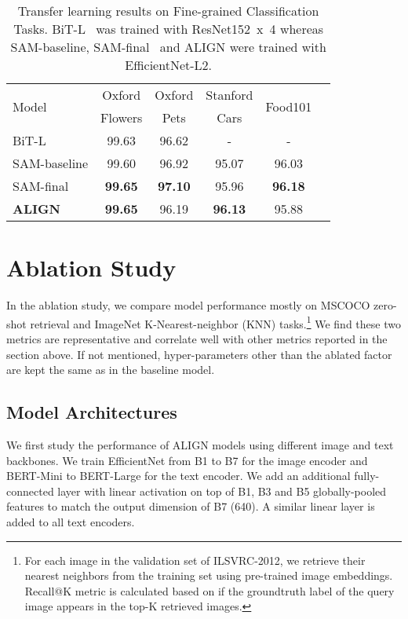 \documentclass{article}
\begin{document}
\begin{table}[h!]
\vspace{-2mm}
\begin{center}
\caption{Transfer learning results on Fine-grained Classification Tasks. BiT-L~\cite{kolensnikov:bit} was trained with ResNet152~x~4 whereas SAM-baseline, SAM-final~\cite{foret:sam} and ALIGN were trained with EfficientNet-L2.}
\label{tab:small_result}
\vskip 0.05in
\begin{small}
\begin{tabular}{l|ccccc}
\toprule
\multirow{2}{*}{Model} & Oxford  & Oxford & Stanford & \multirow{2}{*}{Food101} \\
& Flowers & Pets & Cars & \\
\midrule
BiT-L& 99.63 & 96.62 & -  & - \\
SAM-baseline
& 99.60 & 96.92 & 95.07 & 96.03 \\
SAM-final
& \textbf{99.65} & \textbf{97.10} & 95.96  & \textbf{96.18} \\
\bf{ALIGN}
& \textbf{99.65} & 96.19 & \textbf{96.13} & 95.88 \\
\bottomrule
\end{tabular}
\end{small}
\end{center}
\vspace{-5mm}
\end{table}

\section{Ablation Study}\label{sec:ablation}

In the ablation study, we compare model performance mostly on MSCOCO zero-shot retrieval and ImageNet K-Nearest-neighbor (KNN) tasks.\footnote{For each image in the validation set of ILSVRC-2012, we retrieve their nearest neighbors from the training set using pre-trained image embeddings. Recall@K metric is calculated based on if the groundtruth label of the query image appears in the top-K retrieved images.} We find these two metrics are representative and correlate well with other metrics reported in the section above. If not mentioned, hyper-parameters other than the ablated factor are kept the same as in the baseline model.

\subsection{Model Architectures}
We first study the performance of ALIGN models using different image and text backbones. We train EfficientNet from B1 to B7 for the image encoder and BERT-Mini to BERT-Large for the text encoder. We add an additional fully-connected layer with linear activation on top of B1, B3 and B5 globally-pooled features to match the output dimension of B7 (640). A similar linear layer is added to all text encoders. 
\end{document}

